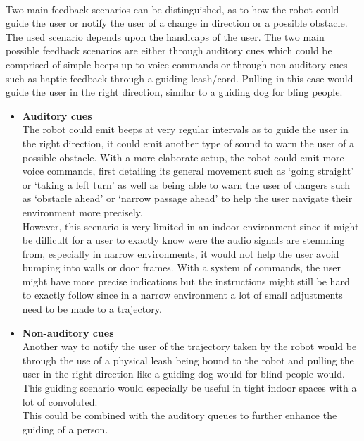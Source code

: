 \documentclass[plainarticle,zihtitle,english,final,hyperref,utf8]{zihpub}
\begin{document}
\\
\newline
Two main feedback scenarios can be distinguished, as to how the robot could guide the user or notify the user of a change in direction or a possible obstacle. The used scenario depends upon the handicaps of the user. The two main possible feedback scenarios are either through auditory cues which could be comprised of simple beeps up to voice commands or through non-auditory cues such as haptic feedback through a guiding leash/cord. Pulling in this case would guide the user in the right direction, similar to a guiding dog for bling people.
\begin{itemize}
    \item \textbf{Auditory cues}\\
    The robot could emit beeps at very regular intervals as to guide the user in the right direction, it could emit another type of sound to warn the user of a possible obstacle. With a more elaborate setup, the robot could emit more voice commands, first detailing its general movement such as ‘going straight’ or ‘taking a left turn’ as well as being able to warn the user of dangers such as ‘obstacle ahead’ or ‘narrow passage ahead’ to help the user navigate their environment more precisely.\\
    \newline
    However, this scenario is very limited in an indoor environment since it might be difficult for a user to exactly know were the audio signals are stemming from, especially in narrow environments, it would not help the user avoid bumping into walls or door frames. With a system of commands, the user might have more precise indications but the instructions might still be hard to exactly follow since in a narrow environment a lot of small adjustments need to be made to a trajectory.\\
    \item \textbf{Non-auditory cues}\\
    Another way to notify the user of the trajectory taken by the robot would be through the use of a physical leash being bound to the robot and pulling the user in the right direction like a guiding dog would for blind people would. This guiding scenario would especially be useful in tight indoor spaces with a lot of convoluted.\\
    \newline
    This could be combined with the auditory queues to further enhance the guiding of a person.
\end{itemize}
\end{document}
